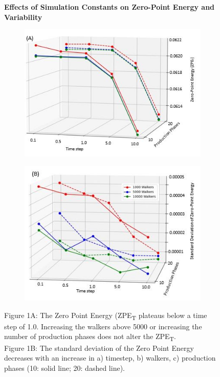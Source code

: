 \documentclass[journal=jacsat,manuscript=article]{achemso}
\newcommand*{\figuretitle}[1]{%
    {\centering%
    \textbf{#1}%
    \par\medskip}%
}
\begin{document}
\begin{figure}[H]
\centering
\figuretitle{Effects of Simulation Constants on Zero-Point Energy and Variability}
\begin{subfigure}{.5\textwidth}
  \centering
  \includegraphics[width=\linewidth]{figures/fig_1A.jpg}
\end{subfigure}%
\begin{subfigure}{.5\textwidth}
  \centering
  \includegraphics[width=\linewidth]{figures/fig_1B.jpg}
\end{subfigure}
\caption{Figure 1A: The Zero Point Energy (ZPE\textsubscript{T} plateaus below a time step of 1.0. Increasing the walkers above 5000 or increasing the number of production phases does not alter the ZPE\textsubscript{T}.\\
Figure 1B: The standard deviation of the Zero Point Energy decreases with an increase in a) timestep, b) walkers, c) production phases (10: solid line; 20: dashed line).}
\end{figure}
\end{document}
